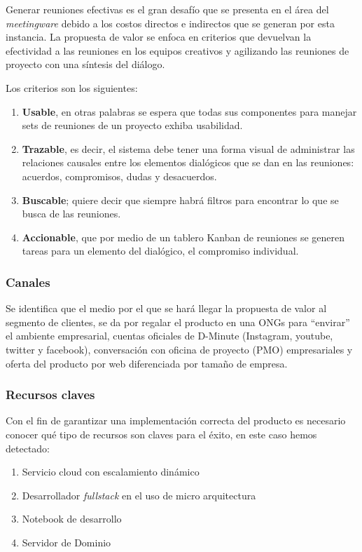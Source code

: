 Generar reuniones efectivas es el gran desafío que se presenta en el área del \textit{meetingware} debido a los costos directos e indirectos que se generan por esta instancia. La propuesta de valor se enfoca en criterios que devuelvan la efectividad a las reuniones en los equipos creativos y agilizando las reuniones de proyecto con una síntesis del diálogo.

Los criterios son los siguientes:

\begin{enumerate}[1.]
	\item \textbf{Usable}, en otras palabras se espera que todas sus componentes para manejar sets de reuniones de un proyecto exhiba usabilidad.
	\item \textbf{Trazable}, es decir, el sistema debe tener una forma visual de administrar las relaciones causales entre los elementos dialógicos que se dan en las reuniones: acuerdos, compromisos, dudas y desacuerdos.
	\item \textbf{Buscable}; quiere decir que siempre habrá filtros para encontrar lo que se busca de las reuniones.
	\item \textbf{Accionable}, que por medio de un tablero Kanban de reuniones se generen tareas para un elemento del dialógico, el compromiso individual.
\end{enumerate}


\subsubsection{Canales}

Se identifica que el medio por el que se hará llegar la propuesta de valor al segmento de clientes, se da por regalar el producto en una ONGs para “envirar” el ambiente empresarial, cuentas oficiales de D-Minute (Instagram, youtube, twitter y facebook), conversación con oficina de proyecto (PMO) empresariales y oferta del producto por web diferenciada por tamaño de empresa.

\subsubsection{Recursos claves}

Con el fin de garantizar una implementación correcta del producto es necesario conocer qué tipo de recursos son claves para el éxito, en este caso hemos detectado:

\begin{enumerate}[1.]
	\item Servicio cloud con escalamiento dinámico
	\item Desarrollador \textit{fullstack} en el uso de micro arquitectura
	\item Notebook de desarrollo
	\item Servidor de Dominio 
\end{enumerate}

